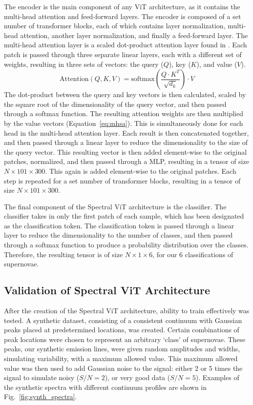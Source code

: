The encoder is the main component of any ViT architecture, as it contains the 
multi-head attention and feed-forward layers. The encoder is composed of a set number of
transformer blocks, each of which contains layer normalization, multi-head attention, another 
layer normalization, and finally a feed-forward layer. The multi-head attention layer 
is a scaled dot-product attention layer found in \textcite{vaswani2017}. Each patch 
is passed through three separate linear layers, each with a different set of weights, 
resulting in three sets of vectors: the query ($Q$), key ($K$), and value ($V$).
\begin{equation}
    \label{eq:mhsa}
    \text{Attention}(Q, K, V) = \text{softmax}\left(\frac{Q\cdot K^T}{\sqrt{d_k}}\right)\cdot V
\end{equation}
The dot-product between the query and key vectors is then calculated,
scaled by the square root of the dimensionality of the query vector, and then passed through a softmax function.
The resulting attention weights are then multiplied by the value vectors (Equation~\ref{eq:mhsa}). 
This is simultaneously done for each head in the multi-head attention layer. Each result is then 
concatenated together, and then passed through a linear layer to reduce the dimensionality
to the size of the query vector. This resulting vector is then added
element-wise to the original patches, normalized, and then passed through a MLP, 
resulting in a tensor of size $N \times 101 \times 300$. This again is added element-wise to the original patches. 
Each step is repeated for a set number of transformer blocks, resulting in a tensor of size
$N \times 101 \times 300$.

The final component of the Spectral ViT architecture is the classifier. The classifier
takes in only the first patch of each sample, which has been designated as the classification token.
The classification token is passed through a linear layer to reduce the dimensionality to the
number of classes, and then passed through a softmax function to produce a probability distribution
over the classes. Therefore, the resulting tensor is of size $N \times 1 \times 6$, for our 
6 classifications of supernovae.

\subsection{Validation of Spectral ViT Architecture}
\label{ssec:validation}
After the creation of the Spectral ViT architecture, ability to train effectively 
was tested. A synthetic dataset, consisting of a consistent continuum with 
Gaussian peaks placed at predetermined locations, was created. Certain combinations of 
peak locations were chosen to represent an arbitrary `class' of supernovae. These peaks, 
our synthetic emission lines, were given random amplitudes and widths, simulating  
variability, with a maximum allowed value. This maximum allowed value was then used to add 
Gaussian noise to the signal: either 2 or 5 times the signal to simulate noisy ($S/N=2$),
or very good data ($S/N=5$). Examples of the synthetic spectra with different continuum profiles 
are shown in Fig.~\ref{fig:synth_spectra}. 

